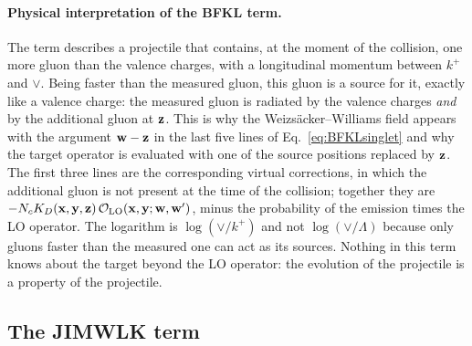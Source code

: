 \paragraph{Physical interpretation of the BFKL term.} The term describes a projectile that contains, at the moment of the collision, one more gluon than the valence charges, with a longitudinal momentum between $k^+$ and $\vee$. Being faster than the measured gluon, this gluon is a source for it, exactly like a valence charge: the measured gluon is radiated by the valence charges \emph{and} by the additional gluon at $\mathbf{z}$. This is why the Weizs\"acker--Williams field appears with the argument $\mathbf{w}-\mathbf{z}$ in the last five lines of Eq.~\eqref{eq:BFKLsinglet} and why the target operator is evaluated with one of the source positions replaced by $\mathbf{z}$. The first three lines are the corresponding virtual corrections, in which the additional gluon is not present at the time of the collision; together they are $-N_cK_D(\mathbf{x},\mathbf{y},\mathbf{z})\,\mathcal O_{\rm LO}(\mathbf{x},\mathbf{y};\mathbf{w},\mathbf{w}')$, minus the probability of the emission times the LO operator. The logarithm is $\log(\vee/k^+)$ and not $\log(\vee/\Lambda)$ because only gluons faster than the measured one can act as its sources. Nothing in this term knows about the target beyond the LO operator: the evolution of the projectile is a property of the projectile.

\subsection{The JIMWLK term}\label{sec:JIMWLK}


